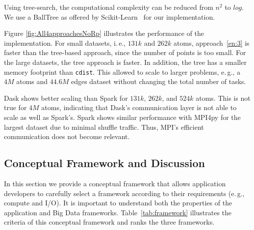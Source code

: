 Using tree-search, the computational complexity can be reduced from $n^2$ to $log$. 
We use a BallTree as offered by Scikit-Learn~\cite{scikit-nearest} for our implementation.

Figure \ref{fig:All4approachesNoRp} illustrates the performance of the implementation.
For small datasets, i.\,e., $131k$ and $262k$ atoms, approach~\ref{en:3} is faster than the tree-based approach, since the number of points is too small.
For the large datasets, the tree approach is faster.
In addition, the tree has a smaller memory footprint than \texttt{cdist}.
This allowed to scale to larger problems, e.\,g., a $4M$ atoms and $44.6M$ edges dataset without changing the total number of tasks.

Dask shows better scaling than Spark for $131k$, $262k$, and $524k$ atoms.
This is not true for $4M$ atoms, indicating that Dask's communication layer is not able to scale as well as Spark's.
Spark shows similar performance with MPI4py for the largest dataset due to minimal shuffle traffic.
Thus, MPI's efficient communication does not become relevant.

\subsection{Conceptual Framework and Discussion}
In this section we provide a conceptual framework that allows application developers to carefully select a framework according to their requirements (e.\,g., compute and I/O).
It is important to understand both the properties of the application and Big Data frameworks.
Table~\ref{tab:framework} illustrates the criteria of this conceptual framework and ranks the three frameworks.

